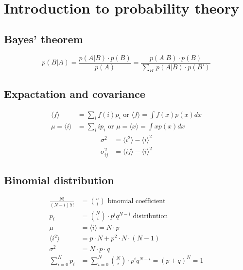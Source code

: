 \section{Introduction to probability theory}

\subsection*{Bayes' theorem}

\begin{equation*}
    p(B|A) = \frac{p(A|B) \cdot p(B)}{p(A)} = \frac{p(A|B) \cdot p(B)}{\sum_{B'}p(A|B) \cdot p(B')}
\end{equation*}

\subsection*{Expactation and covariance}

\begin{equation*}
    \begin{aligned}
        \langle f \rangle &= \sum_i f(i)p_i \text{ or } \langle f \rangle = \int f(x) p(x) dx \\
        \mu = \langle i \rangle &= \sum_i i p_i \text{ or } \mu = \langle x \rangle = \int x p(x) dx
    \end{aligned}
\end{equation*}
\begin{equation*}
    \begin{aligned}
        \sigma^2 &= \langle i^2 \rangle - \langle i \rangle^2 \\
        \sigma_{ij}^2 &= \langle ij \rangle - \langle i \rangle^2
    \end{aligned}
\end{equation*}

\subsection*{Binomial distribution}

\begin{equation*}
    \begin{aligned}
        \frac{N!}{(N-i)!i!} &= {n \choose i} \text{  binomial coefficient} \\
        p_i &= {N \choose i} \cdot p^i q^{N-i} \text{  distribution} \\
        \mu &= \langle i \rangle = N \cdot p \\
        \langle i^2 \rangle &= p \cdot N + p^2 \cdot N \cdot (N-1) \\
        \sigma^2 &= N \cdot p \cdot q \\
        \sum_{i = 0}^N p_{i} &= \sum_{i = 0}^N {N \choose i} \cdot p^i q^{N-i} = \left(p + q\right)^N = 1
    \end{aligned}
\end{equation*}

